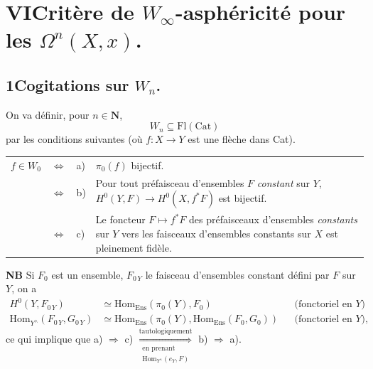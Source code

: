 \documentclass[11pt]{article}
\newcommand{\printedpage}[1]{\marginpar{\footnotesize p.~#1}}
\newcommand{\msp}[1]{\marginpar{\footnotesize [#1]}}
\newcommand{\HomEns}{\mathrm{Hom}_{\mathrm{Ens}}}
\begin{document}
\printedpage{115}

\msp{page 171}

\section*{VI\quad Critère de $W_\infty$-asphéricité pour les $\Omega^n(X,x)$.}

\subsection*{1\quad Cogitations sur $W_n$.}

On va définir, pour $n \in \mathbf{N}$,
\[
W_n \subseteq \mathrm{Fl}(\mathrm{Cat})
\]
par les conditions suivantes (où $f : X \longrightarrow Y$ est une flèche dans Cat).

\noindent\begin{tabular}{@{}l c l >{\RaggedRight\arraybackslash}p{}@{}}
$f \in W_0$ & $\Longleftrightarrow$ & a) & $\pi_0(f)$ bijectif.\\
 & $\Longleftrightarrow$ & b) & Pour tout préfaisceau d'ensembles $F$ \textit{constant} sur $Y$, $H^0(Y,F) \longrightarrow H^0(X,f^*F)$ est bijectif.\\
 & $\Longleftrightarrow$ & c) & Le foncteur $F \longmapsto f^*F$ des préfaisceaux d'ensembles \textit{constants} sur $Y$ vers les faisceaux d'ensembles constants sur $X$ est pleinement fidèle.
\end{tabular}



\textbf{NB} Si $F_0$ est un ensemble, $F_{0\,Y}$ le faisceau d'ensembles constant défini par $F$ sur $Y$, on a
\[
\begin{aligned}
H^0(Y,F_{0\,Y}) &\simeq \HomEns(\pi_0(Y),F_0) && \text{(fonctoriel en $Y$)}\\
\mathrm{Hom}_{Y^\wedge}(F_{0\,Y},G_{0\,Y}) &\simeq \HomEns(\pi_0(Y),\HomEns(F_0,G_0)) && \text{(fonctoriel en $Y$),}
\end{aligned}
\]
ce qui implique que a) $\Longrightarrow$ c) $\underset{\substack{\text{en prenant}\\ \mathrm{Hom}_{Y^\wedge}(e_Y,F)}}{\overset{\text{tautologiquement}}{\Longrightarrow}}$ b) $\Longrightarrow$ a).
\end{document}
